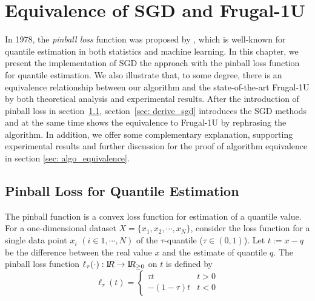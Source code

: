 \chapter{Equivalence of SGD and Frugal-1U}
\label{ch: algo_equal}

\graphicspath{{Figures/Frugal_SGD/}{./}} 

           
In 1978, the \textit{pinball loss} function was proposed by \citeauthor{koenkerRegressionQuantiles1978}\cite{koenkerRegressionQuantiles1978}, which is well-known for quantile estimation in both statistics and machine learning. In this chapter, we present the implementation of SGD the approach with the pinball loss function for quantile estimation. We also illustrate that, to some degree, there is an equivalence relationship between our algorithm and the state-of-the-art Frugal-1U\cite{maFrugalStreamingEstimating2014} by both theoretical analysis and experimental results. After the introduction of pinball loss in section~\ref{sec: pinball_loss}, section~\ref{sec: derive_sgd} introduces the SGD methods and at the same time shows the equivalence to Frugal-1U by rephrasing the algorithm. In addition, we offer some complementary explanation, supporting experimental results and further discussion for the proof of algorithm equivalence in section \ref{sec: algo_equivalence}.

\section{Pinball Loss for Quantile Estimation}
\label{sec: pinball_loss}
The pinball function is a convex loss function for estimation of a quantile value.
For a one-dimensional dataset $X = \{x_1, x_2, \cdots, x_N\}$, 
consider the loss function for a single data point $x_i$ $(i \in {1, \cdots, N})$ of the $\tau$-quantile ($\tau \in (0,1)$).
Let $t := x - q$ be the difference between the real value $x$ and the estimate of quantile $q$.
The pinball loss function $\ell_{\tau}(\cdot): \mathrm I\!R \to \mathrm I\!R_{\geq 0}$ on $t$ is defined by%
%
\begin{equation}
    \ell_\tau(t)= 
        \begin{cases}
            \tau t & t > 0\\
            -(1-\tau) t & t < 0
        \end{cases}
\end{equation}


